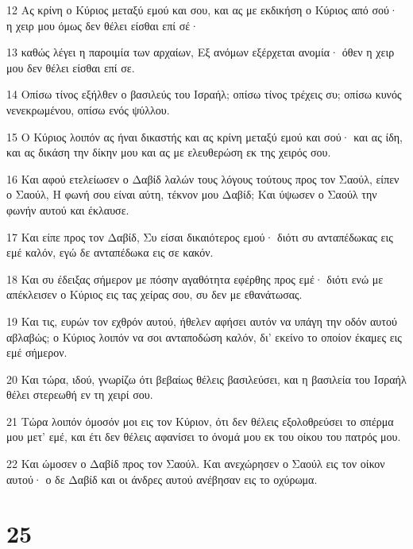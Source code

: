 \par 12 Ας κρίνη ο Κύριος μεταξύ εμού και σου, και ας με εκδικήση ο Κύριος από σού· η χειρ μου όμως δεν θέλει είσθαι επί σέ·
\par 13 καθώς λέγει η παροιμία των αρχαίων, Εξ ανόμων εξέρχεται ανομία· όθεν η χειρ μου δεν θέλει είσθαι επί σε.
\par 14 Οπίσω τίνος εξήλθεν ο βασιλεύς του Ισραήλ; οπίσω τίνος τρέχεις συ; οπίσω κυνός νενεκρωμένου, οπίσω ενός ψύλλου.
\par 15 Ο Κύριος λοιπόν ας ήναι δικαστής και ας κρίνη μεταξύ εμού και σού· και ας ίδη, και ας δικάση την δίκην μου και ας με ελευθερώση εκ της χειρός σου.
\par 16 Και αφού ετελείωσεν ο Δαβίδ λαλών τους λόγους τούτους προς τον Σαούλ, είπεν ο Σαούλ, Η φωνή σου είναι αύτη, τέκνον μου Δαβίδ; Και ύψωσεν ο Σαούλ την φωνήν αυτού και έκλαυσε.
\par 17 Και είπε προς τον Δαβίδ, Συ είσαι δικαιότερος εμού· διότι συ ανταπέδωκας εις εμέ καλόν, εγώ δε ανταπέδωκα εις σε κακόν.
\par 18 Και συ έδειξας σήμερον με πόσην αγαθότητα εφέρθης προς εμέ· διότι ενώ με απέκλεισεν ο Κύριος εις τας χείρας σου, συ δεν με εθανάτωσας.
\par 19 Και τις, ευρών τον εχθρόν αυτού, ήθελεν αφήσει αυτόν να υπάγη την οδόν αυτού αβλαβώς; ο Κύριος λοιπόν να σοι ανταποδώση καλόν, δι' εκείνο το οποίον έκαμες εις εμέ σήμερον.
\par 20 Και τώρα, ιδού, γνωρίζω ότι βεβαίως θέλεις βασιλεύσει, και η βασιλεία του Ισραήλ θέλει στερεωθή εν τη χειρί σου.
\par 21 Τώρα λοιπόν όμοσόν μοι εις τον Κύριον, ότι δεν θέλεις εξολοθρεύσει το σπέρμα μου μετ' εμέ, και έτι δεν θέλεις αφανίσει το όνομά μου εκ του οίκου του πατρός μου.
\par 22 Και ώμοσεν ο Δαβίδ προς τον Σαούλ. Και ανεχώρησεν ο Σαούλ εις τον οίκον αυτού· ο δε Δαβίδ και οι άνδρες αυτού ανέβησαν εις το οχύρωμα.

\chapter{25}

